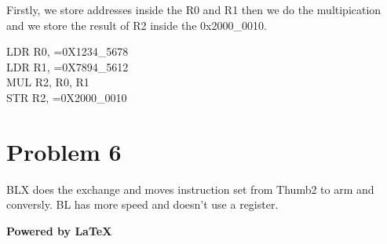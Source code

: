 \documentclass[paper=a4, fontsize=11pt]{scrartcl} %
\numberwithin{equation}{section} %
\numberwithin{figure}{section} %
\numberwithin{table}{section} %
\begin{document}
Firstly, we store addresses inside the R0 and R1 then we do the multipication
and we store the result of R2 inside the 0x2000\_0010.

LDR R0, =0X1234\_5678 \\
LDR R1, =0X7894\_5612 \\
MUL R2, R0, R1 \\
STR R2, =0X2000\_0010 \\


\section{Problem 6}

BLX does the exchange and moves instruction set from Thumb2 to arm and conversly.
BL has more speed and doesn't use a register.


\begin{center}
    \textbf{Powered by \LaTeX}
\end{center}
\end{document}
